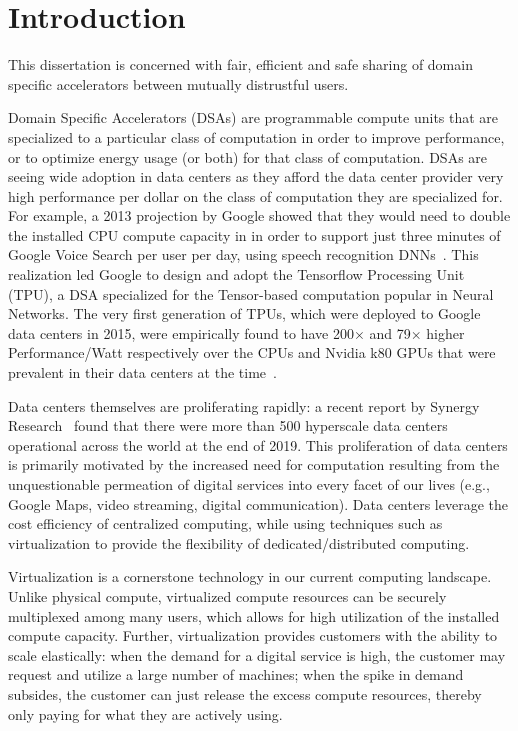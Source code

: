 \chapter{Introduction}
\label{sec:intro}

This dissertation is concerned with fair, efficient and safe sharing of
domain specific accelerators between mutually distrustful users.

Domain Specific Accelerators (DSAs) are programmable compute units that are
specialized to a particular class of computation in order to improve
performance, or to optimize energy usage (or both) for that class of
computation. DSAs are seeing wide adoption in  data centers as they afford
the data center provider very high performance per dollar on the class of
computation they are specialized for. For example, a 2013 projection by Google
showed that they would need to double the installed CPU compute capacity in
in order to support just three minutes of Google Voice Search per user per
day, using speech recognition DNNs~\cite{TPU-CACM}.
This realization led Google to design and adopt the Tensorflow Processing
Unit (TPU), a DSA specialized for the Tensor-based computation popular in
Neural Networks. The very first generation of TPUs, which were deployed to
Google data centers in 2015, were empirically found to have 200$\times$ and
79$\times$ higher Performance/Watt respectively over the CPUs and Nvidia k80
GPUs that were prevalent in their data centers at the time~\cite{TPU-ISCA}.

Data centers themselves are proliferating rapidly: a recent report by
Synergy Research~\cite{datacentergrowth-src} found that there were more than
500 hyperscale data centers operational across the world at the end of 2019.
This proliferation of data centers is primarily motivated by the increased
need for computation resulting from the unquestionable permeation of digital
services into every facet of our lives (e.g., Google Maps, video streaming,
digital communication). Data centers leverage the cost efficiency of
centralized computing, while using techniques such as virtualization to
provide the flexibility of dedicated/distributed computing.

Virtualization is a cornerstone technology in our current computing landscape.
Unlike physical compute, virtualized compute resources can be securely
multiplexed among many users, which allows for high utilization of the
installed compute capacity. Further, virtualization provides customers with
the ability to scale elastically: when the demand for a digital service is
high, the customer may request and utilize a large number of machines; when
the spike in demand subsides, the customer can just release the excess compute
resources, thereby only paying for what they are actively using.

